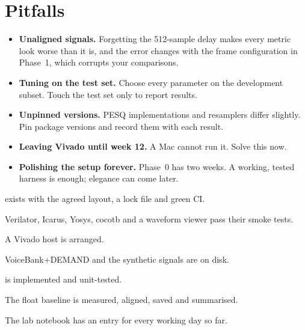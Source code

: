 \section{Pitfalls}\label{sec:setup:pitfalls}

\begin{pitfallbox}
\begin{itemize}
  \item \textbf{Unaligned signals.} Forgetting the 512-sample delay makes every
        metric look worse than it is, and the error changes with the frame
        configuration in Phase~1, which corrupts your comparisons.
  \item \textbf{Tuning on the test set.} Choose every parameter on the
        development subset. Touch the test set only to report results.
  \item \textbf{Unpinned versions.} PESQ implementations and resamplers differ
        slightly. Pin package versions and record them with each result.
  \item \textbf{Leaving Vivado until week 12.} A Mac cannot run it. Solve this
        now.
  \item \textbf{Polishing the setup forever.} Phase~0 has two weeks. A working,
        tested harness is enough; elegance can come later.
\end{itemize}
\end{pitfallbox}

\begin{donebox}
\begin{checklist}
  \item {} exists with the agreed layout, a lock file and green CI.
  \item Verilator, Icarus, Yosys, cocotb and a waveform viewer pass their smoke tests.
  \item A Vivado host is arranged.
  \item VoiceBank+DEMAND and the synthetic signals are on disk.
  \item {} is implemented and unit-tested.
  \item The float baseline is measured, aligned, saved and summarised.
  \item The lab notebook has an entry for every working day so far.
\end{checklist}
\end{donebox}
